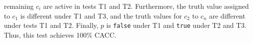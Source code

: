 \documentclass[addpoints, answers]{exam}
\newcommand{\Code}[1]{\texttt{#1}}
\begin{document}
\begin{questions}
\begin{solution}
\begin{itemize}
        remaining $c_i$ are active in tests T1 and T2. Furthermore,
        the truth value assigned to $c_1$ is different under T1 and
        T3, and the truth values for $c_2$ to $c_n$ are different
        under tests T1 and T2.  Finally, $p$ is \Code{false} under T1
        and \Code{true} under T2 and T3. Thus, this test achieves
        100\% CACC.

\end{itemize}
\end{solution}
\end{questions}
\end{document}
